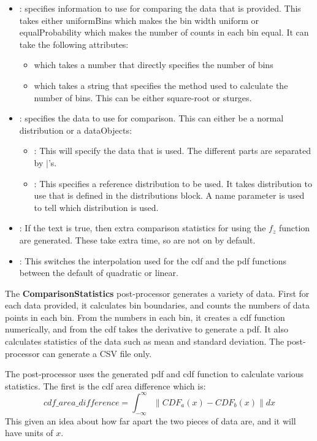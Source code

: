 \begin{itemize}
\item {}: specifies information to use for comparing the
  data that is provided.  This takes either uniformBins which makes
  the bin width uniform or equalProbability which makes the number
  of counts in each bin equal.  It can take the following attributes:
  \begin{itemize}
  \item {} which takes a number that directly
    specifies the number of bins
  \item {} which takes a string that specifies the
    method used to calculate the number of bins.  This can be either
    square-root or sturges.
  \end{itemize}
\item {}: specifies the data to use for comparison.
  This can either be a normal distribution or a dataObjects:
  \begin{itemize}
  \item {}: This will specify the data that is used.  The
    different parts are separated by $|$'s.
  \item {}: This specifies a reference distribution
    to be used.  It takes distribution to use that is defined in the
    distributions block.  A name parameter is used to tell which
    distribution is used.
  \end{itemize}
\item {}: If the text is true, then extra comparison
  statistics for using the $f_z$ function are generated.  These take
  extra time, so are not on by default.
\item {}: This switches the interpolation used
  for the cdf and the pdf functions between the default of quadratic
  or linear.
\end{itemize}

The \textbf{ComparisonStatistics} post-processor generates a variety
of data.  First for each data provided, it calculates bin boundaries,
and counts the numbers of data points in each bin.  From the numbers
in each bin, it creates a cdf function numerically, and from the cdf
takes the derivative to generate a pdf.  It also calculates statistics
of the data such as mean and standard deviation. The post-processor
can generate a CSV file only.

The post-processor uses the generated pdf and cdf function to
calculate various statistics.  The first is the cdf area difference which is:
\begin{equation}
  cdf\_area\_difference = \int_{-\infty}^{\infty}{\|CDF_a(x)-CDF_b(x)\|dx}
\end{equation}
This given an idea about how far apart the two pieces of data are, and
it will have units of $x$.

